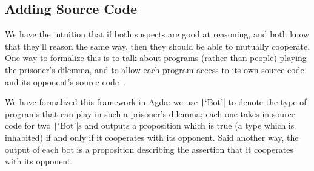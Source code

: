   \subsection{Adding Source Code}

    We have the intuition that if both suspects are good at reasoning,
    and both know that they'll reason the same way, then they should
    be able to mutually cooperate.  One way to formalize this is to
    talk about programs (rather than people) playing the prisoner's
    dilemma, and to allow each program access to its own source code
    and its opponent's source
    code~\cite{BaraszChristianoFallensteinEtAl2014}.

    We have formalized this framework in Agda: we use
    \texttt|‘Bot’| to denote the type of programs that can
    play in such a prisoner's dilemma; each one takes in source code
    for two \texttt|‘Bot’|s and outputs a proposition which
    is true (a type which is inhabited) if and only if it cooperates
    with its opponent.  Said another way, the output of each bot is a
    proposition describing the assertion that it cooperates with its
    opponent.

\begin{code}%
\>  \<%
\\
%
\\
\> \<%
\\
\> \<%
\\
\> \<%
\\
\>  \AgdaSymbol{:}  \AgdaSymbol{\{}\AgdaSymbol{\}}   \<%
\\
\>  \AgdaSymbol{\{}\AgdaSymbol{\}}\<%
\\
\>[2]\<[3]%
\>[3]\AgdaSymbol{=}  \AgdaSymbol{(}   \<%
\\
\>[3]\<[12]%
\>[12]    \<%
\\
\>[3]\<[12]%
\>[12]  \AgdaSymbol{(} \AgdaSymbol{))}\<%
\end{code}

